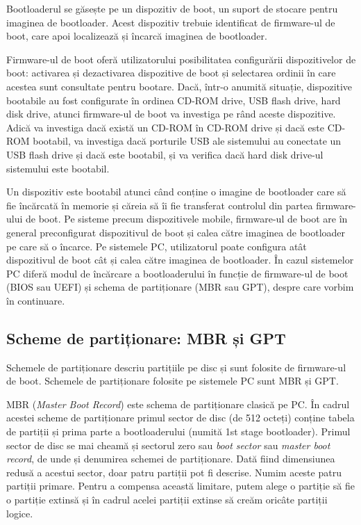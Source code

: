 Bootloaderul se găsește pe un dispozitiv de boot, un suport de stocare pentru imaginea de bootloader.
Acest dispozitiv trebuie identificat de firmware-ul de boot, care apoi localizează și încarcă imaginea de bootloader.

Firmware-ul de boot oferă utilizatorului posibilitatea configurării dispozitivelor de boot: activarea și dezactivarea dispozitive de boot și selectarea ordinii în care acestea sunt consultate pentru bootare.
 Dacă, într-o anumită situație, dispozitive bootabile au fost configurate în ordinea CD-ROM drive, USB flash drive, hard disk drive, atunci firmware-ul de boot va investiga pe rând aceste dispozitive.
 Adică va investiga dacă există un CD-ROM în CD-ROM drive și dacă este CD-ROM bootabil, va investiga dacă porturile USB ale sistemului au conectate un USB flash drive și dacă este bootabil, și va verifica dacă hard disk drive-ul sistemului este bootabil.

Un dispozitiv este bootabil atunci când conține o imagine de bootloader care să fie încărcată în memorie și căreia să îi fie transferat controlul din partea firmware-ului de boot.
Pe sisteme precum dispozitivele mobile, firmware-ul de boot are în general preconfigurat dispozitivul de boot și calea către imaginea de bootloader pe care să o încarce.
Pe sistemele PC, utilizatorul poate configura atât dispozitivul de boot cât și calea către imaginea de bootloader.
 În cazul sistemelor PC diferă modul de încărcare a bootloaderului în funcție de firmware-ul de boot (BIOS sau UEFI) și schema de partiționare (MBR sau GPT), despre care vorbim în continuare.

\subsection{Scheme de partiționare: MBR și GPT}
\label{sec:boot:bootdev:scheme}

Schemele de partiționare descriu partițiile pe disc și sunt folosite de firmware-ul de boot.
 Schemele de partiționare folosite pe sistemele PC sunt MBR și GPT.

MBR (\textit{Master Boot Record}) este schema de partiționare clasică pe PC.
În cadrul acestei scheme de partiționare primul sector de disc (de 512 octeți) conține tabela de partiții și prima parte a bootloaderului (numită 1st stage bootloader).
Primul sector de disc se mai cheamă și sectorul zero sau \textit{boot sector} sau \textit{master boot record}, de unde și denumirea schemei de partiționare.
 Dată fiind dimensiunea redusă a acestui sector, doar patru partiții pot fi descrise.
Numim aceste patru partiții primare.
Pentru a compensa această limitare, putem alege o partiție să fie o partiție extinsă și în cadrul acelei partiții extinse să creăm oricâte partiții logice.

